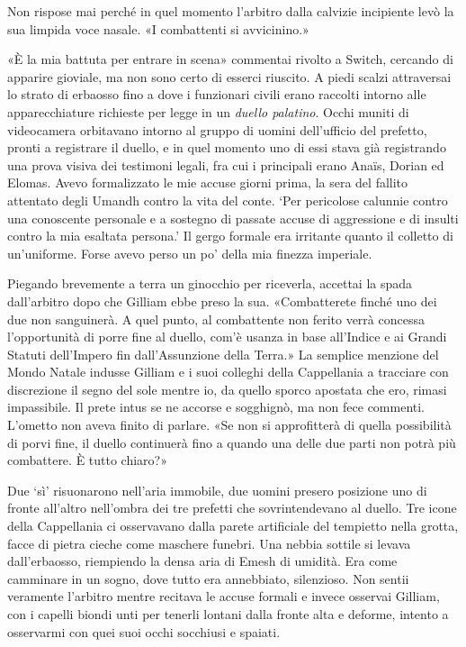Non rispose mai perché in quel momento l'arbitro dalla calvizie
incipiente levò la sua limpida voce nasale. «I combattenti si
avvicinino.»

«È la mia battuta per entrare in scena» commentai rivolto a Switch,
cercando di apparire gioviale, ma non sono certo di esserci riuscito. A
piedi scalzi attraversai lo strato di erbaosso fino a dove i funzionari
civili erano raccolti intorno alle apparecchiature richieste per legge
in un \emph{duello palatino}. Occhi muniti di videocamera orbitavano
intorno al gruppo di uomini dell'ufficio del prefetto, pronti a
registrare il duello, e in quel momento uno di essi stava già
registrando una prova visiva dei testimoni legali, fra cui i principali
erano Anaïs, Dorian ed Elomas. Avevo formalizzato le mie accuse giorni
prima, la sera del fallito attentato degli Umandh contro la vita del
conte. `Per pericolose calunnie contro una conoscente personale e a
sostegno di passate accuse di aggressione e di insulti contro la mia
esaltata persona.' Il gergo formale era irritante quanto il colletto di
un'uniforme. Forse avevo perso un po' della mia finezza imperiale.

Piegando brevemente a terra un ginocchio per riceverla, accettai la
spada dall'arbitro dopo che Gilliam ebbe preso la sua. «Combatterete
finché uno dei due non sanguinerà. A quel punto, al combattente non
ferito verrà concessa l'opportunità di porre fine al duello, com'è
usanza in base all'Indice e ai Grandi Statuti dell'Impero fin
dall'Assunzione della Terra.» La semplice menzione del Mondo Natale
indusse Gilliam e i suoi colleghi della Cappellania a tracciare con
discrezione il segno del sole mentre io, da quello sporco apostata che
ero, rimasi impassibile. Il prete intus se ne accorse e sogghignò, ma
non fece commenti. L'ometto non aveva finito di parlare. «Se non si
approfitterà di quella possibilità di porvi fine, il duello continuerà
fino a quando una delle due parti non potrà più combattere. È tutto
chiaro?»

Due `sì' risuonarono nell'aria immobile, due uomini presero posizione
uno di fronte all'altro nell'ombra dei tre prefetti che sovrintendevano
al duello. Tre icone della Cappellania ci osservavano dalla parete
artificiale del tempietto nella grotta, facce di pietra cieche come
maschere funebri. Una nebbia sottile si levava dall'erbaosso, riempiendo
la densa aria di Emesh di umidità. Era come camminare in un sogno, dove
tutto era annebbiato, silenzioso. Non sentii veramente l'arbitro mentre
recitava le accuse formali e invece osservai Gilliam, con i capelli
biondi unti per tenerli lontani dalla fronte alta e deforme, intento a
osservarmi con quei suoi occhi socchiusi e spaiati.

